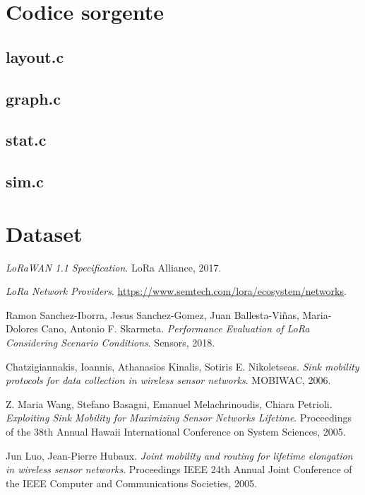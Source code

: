 \documentclass[a4paper,12pt]{article}
\theoremstyle{definition}
\begin{document}
\appendix
\section{Codice sorgente}

\subsection{layout.c}


\subsection{graph.c}


\subsection{stat.c}


\subsection{sim.c}


\section{Dataset}

\begin{thebibliography}{0}

\textit{LoRaWAN 1.1 Specification}.
LoRa Alliance, 2017.

\textit{LoRa Network Providers}.
\url{https://www.semtech.com/lora/ecosystem/networks}.

Ramon Sanchez-Iborra, Jesus Sanchez-Gomez, Juan Ballesta-Viñas, Maria-Dolores Cano, Antonio F. Skarmeta.
\textit{Performance Evaluation of LoRa Considering Scenario Conditions}. 
Sensors, 2018.

Chatzigiannakis, Ioannis, Athanasios Kinalis, Sotiris E. Nikoletseas.
\textit{Sink mobility protocols for data collection in wireless sensor networks}.
MOBIWAC, 2006.

Z. Maria Wang, Stefano Basagni, Emanuel Melachrinoudis, Chiara Petrioli.
\textit{Exploiting Sink Mobility for Maximizing Sensor Networks Lifetime}.
Proceedings of the 38th Annual Hawaii International Conference on System Sciences, 2005.

Jun Luo, Jean-Pierre Hubaux.
\textit{Joint mobility and routing for lifetime elongation in wireless sensor networks}.
Proceedings IEEE 24th Annual Joint Conference of the IEEE Computer and Communications Societies, 2005.

\end{thebibliography}
\end{document}
